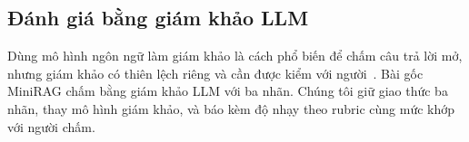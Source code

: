 \subsection{Đánh giá bằng giám khảo LLM}
Dùng mô hình ngôn ngữ làm giám khảo là cách phổ biến để chấm câu trả lời mở, nhưng giám khảo có thiên lệch riêng và cần được kiểm với người~\cite{zheng2023judge}.
Bài gốc MiniRAG chấm bằng giám khảo LLM với ba nhãn.
Chúng tôi giữ giao thức ba nhãn, thay mô hình giám khảo, và báo kèm độ nhạy theo rubric cùng mức khớp với người chấm.
